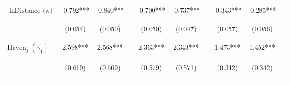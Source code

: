 \documentclass[twoside,a4paper,11pt]{article}
\begin{document}
\begin{table}
{\begin{tabular}{lccc|ccc|ccc}
		$\ln\text{Distance (w)}$ & -0.792*** & -0.840*** &  & -0.700*** & -0.737*** &  & -0.343*** & -0.285*** &  \\
		\vspace{4pt} & \begin{footnotesize}(0.054)\end{footnotesize} & \begin{footnotesize}(0.050)\end{footnotesize} & \begin{footnotesize}\end{footnotesize} & \begin{footnotesize}(0.050)\end{footnotesize} & \begin{footnotesize}(0.047)\end{footnotesize} & \begin{footnotesize}\end{footnotesize} & \begin{footnotesize}(0.057)\end{footnotesize} & \begin{footnotesize}(0.056)\end{footnotesize} & \begin{footnotesize}\end{footnotesize} \\
		$\text{Haven}_j$ $(\gamma_1)$ & 2.598*** & 2.568*** &  & 2.363*** & 2.343*** &  & 1.473*** & 1.452*** &  \\
		\vspace{4pt} & \begin{footnotesize}(0.619)\end{footnotesize} & \begin{footnotesize}(0.609)\end{footnotesize} & \begin{footnotesize}\end{footnotesize} & \begin{footnotesize}(0.579)\end{footnotesize} & \begin{footnotesize}(0.571)\end{footnotesize} & \begin{footnotesize}\end{footnotesize} & \begin{footnotesize}(0.342)\end{footnotesize} & \begin{footnotesize}(0.342)\end{footnotesize} & \begin{footnotesize}\end{footnotesize} \\

\end{tabular}}
\end{table}
\end{document}
